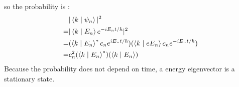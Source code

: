 \documentclass{article}
\theoremstyle{definition}
\theoremstyle{plain}
\begin{document}
\begin {enumerate}[itemindent=30pt,label=\bf Exercise {\arabic*}:]
\subitem so the probability is :
\begin{align*}
	&|\Braket{k\mid \psi_{n}}|^2 \\
	=&|\Braket{k\mid E_{n}}e^{-iE_{n}t/\hbar}|^2 \\
	=&(\Braket{k\mid E_{n}}^{*}c_{n}e^{iE_{n}t/\hbar})(\Braket{k\mid eE_{n}}c_{n}e^{-iE_{n}t/\hbar})\\
	=&c_{n}^{2}(\Braket{k\mid E_{n}}^{*})(\Braket{k\mid E_{n}})
\end{align*}
\subitem Because the probability does not depend on time, a energy eigenvector is a stationary state.
\end{enumerate}
\end{document}
